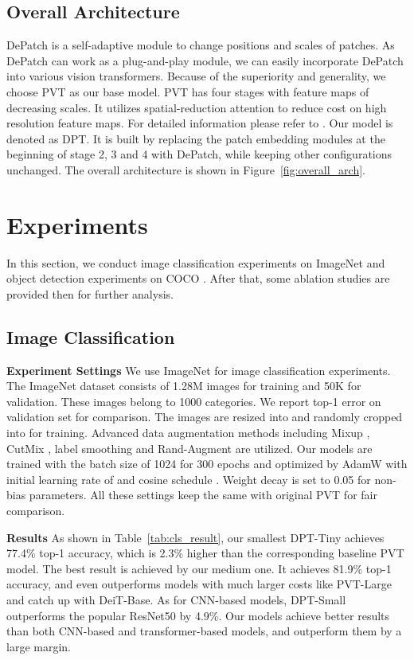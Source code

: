 \documentclass[sigconf,screen]{acmart}
\begin{document}
\subsection{Overall Architecture}

DePatch is a self-adaptive module to change positions and scales of patches. 
As DePatch can work as a plug-and-play module, we can easily incorporate DePatch into various vision transformers. 
Because of the superiority and generality, we choose PVT as our base model. PVT has four stages with feature maps of decreasing scales. It utilizes spatial-reduction attention to reduce cost on high resolution feature maps. For detailed information please refer to \cite{pvt}. Our model is denoted as DPT. It is built by replacing the patch embedding modules at the beginning of stage 2, 3 and 4 with DePatch, while keeping other configurations unchanged. The overall architecture is shown in Figure~\ref{fig:overall_arch}.

\section{Experiments}
In this section, we conduct image classification experiments on ImageNet \cite{imagenet} and object detection experiments on COCO \cite{coco}. After that, some ablation studies are provided then for further analysis.

\subsection{Image Classification}

\textbf{Experiment Settings} We use ImageNet \cite{imagenet} for image classification experiments. The ImageNet dataset consists of 1.28M images for training and 50K for validation. These images belong to 1000 categories. We report top-1 error on validation set for comparison. The images are resized into  and randomly cropped into  for training. Advanced data augmentation methods including Mixup \cite{mixup}, CutMix \cite{cutmix}, label smoothing \cite{labelsmooth} and Rand-Augment \cite{randaug} are utilized. Our models are trained with the batch size of 1024 for 300 epochs and optimized by AdamW \cite{adamw} with initial learning rate of  and cosine schedule \cite{cosine}. Weight decay is set to 0.05 for non-bias parameters. All these settings keep the same with original PVT \cite{pvt} for fair comparison.

\textbf{Results} As shown in Table~\ref{tab:cls_result}, our smallest DPT-Tiny achieves 77.4\% top-1 accuracy, which is 2.3\% higher than the corresponding baseline PVT model. The best result is achieved by our medium one. It achieves 81.9\% top-1 accuracy, and even outperforms models with much larger costs like PVT-Large and catch up with DeiT-Base. As for CNN-based models, DPT-Small outperforms the popular ResNet50 by 4.9\%. Our models achieve better results than both CNN-based and transformer-based models, and outperform them by a large margin.
\end{document}
